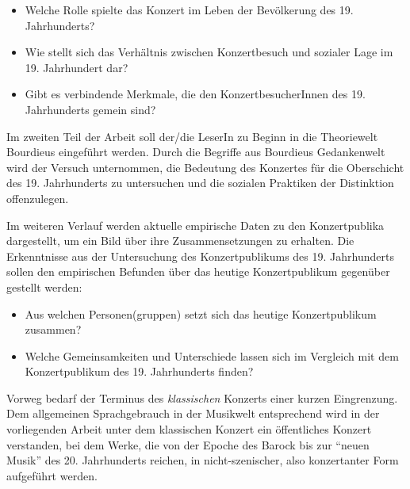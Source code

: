 \documentclass[a4paper, german, oneside]{scrbook}
\begin{document}
\begin{itemize}
	\item Welche Rolle spielte das Konzert im Leben der Bevölkerung des 19. Jahrhunderts? %
	\item Wie stellt sich das Verhältnis zwischen Konzertbesuch und sozialer Lage im 19. Jahrhundert dar?
	\item Gibt es verbindende Merkmale, die den KonzertbesucherInnen des 19. Jahrhunderts gemein sind?
\end{itemize}

Im zweiten Teil der Arbeit soll der/die LeserIn zu Beginn in die Theoriewelt Bourdieus eingeführt werden. Durch die Begriffe aus Bourdieus Gedankenwelt wird der Versuch unternommen, die Bedeutung des Konzertes für die Oberschicht des 19. Jahrhunderts zu untersuchen und die sozialen Praktiken der Distinktion offenzulegen.

Im weiteren Verlauf werden aktuelle empirische Daten zu den Konzertpublika dargestellt, um ein Bild über ihre Zusammensetzungen zu erhalten. Die Erkenntnisse aus der Untersuchung des Konzertpublikums des 19. Jahrhunderts sollen den empirischen Befunden über das heutige Konzertpublikum gegenüber gestellt werden:

\begin{itemize}
	\item Aus welchen Personen(gruppen) setzt sich das heutige Konzertpublikum zusammen?
	\item Welche Gemeinsamkeiten und Unterschiede lassen sich im Vergleich mit dem Konzertpublikum des 19. Jahrhunderts finden?
\end{itemize}

Vorweg bedarf der Terminus des \emph{klassischen} Konzerts einer kurzen Eingrenzung. Dem allgemeinen Sprachgebrauch in der Musikwelt entsprechend wird in der vorliegenden Arbeit unter dem klassischen Konzert ein öffentliches Konzert verstanden, bei dem Werke, die von der Epoche des Barock bis zur \enquote{neuen Musik} des 20. Jahrhunderts reichen, in nicht-szenischer, also konzertanter Form aufgeführt werden. 

\end{document}
